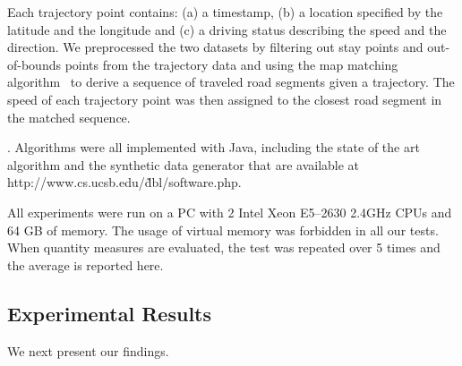 Each trajectory point contains: (a) a timestamp, (b) a location specified by the latitude and the longitude and (c) a driving status describing the speed and the direction. We preprocessed the two datasets by filtering out stay points and out-of-bounds points from the trajectory data and using the map matching algorithm~\cite{Newson2009MM} to derive a sequence of traveled road segments given a trajectory. The speed of each trajectory point was then assigned to the closest road segment in the matched sequence.


.
Algorithms were all implemented with Java, including the state of the art algorithm  and the synthetic data generator that are available at {\small http://www.cs.ucsb.edu/\~dbl/software.php}.

All experiments were run on a PC with 2 Intel Xeon E5--2630 2.4GHz CPUs and 64 GB of memory. The usage of virtual memory was forbidden in all our tests. When quantity measures are evaluated, the test was repeated over 5 times and the average is reported here.



\subsection{Experimental Results}

We next present our findings.
